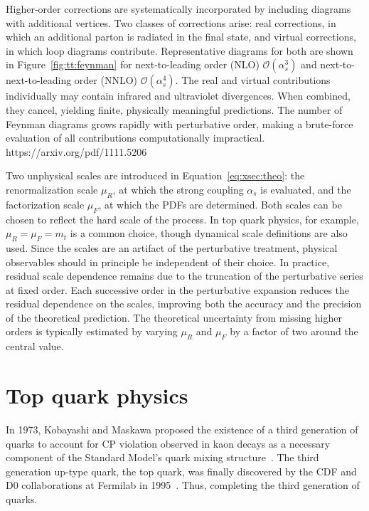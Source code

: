 Higher-order corrections are systematically incorporated by including diagrams with additional 
vertices. Two classes of corrections arise: real corrections, 
in which an additional parton is radiated in the final state, and virtual corrections, 
in which loop diagrams contribute.
Representative diagrams for both are shown in Figure~\ref{fig:tt:feynman} for next-to-leading order (NLO) $\mathcal{O}(\alpha_s^3)$
and next-to-next-to-leading order (NNLO) $\mathcal{O}(\alpha_s^4)$.
The real and virtual contributions individually may contain infrared and ultraviolet divergences.
When combined, they cancel, yielding finite, physically meaningful predictions. 
The number of Feynman diagrams grows rapidly with perturbative order, making a brute-force evaluation of all contributions computationally impractical. https://arxiv.org/pdf/1111.5206

Two unphysical scales are introduced in Equation~\eqref{eq:xsec:theo}: the renormalization scale $\mu_R$, at which the strong coupling $\alpha_s$ is evaluated, and the factorization scale $\mu_F$, at which the PDFs are determined. Both scales can be chosen to reflect the hard scale of the process.
In top quark physics, for example, $\mu_R = \mu_F = m_t$ is a common choice, though dynamical scale definitions are also used.
Since the scales are an artifact of the perturbative treatment, physical observables should in principle be independent of their choice.
In practice, residual scale dependence remains due to the truncation of the perturbative series at fixed order.
Each successive order in the perturbative expansion reduces the residual dependence on the scales, improving both the accuracy and the 
precision of the theoretical prediction.
The theoretical uncertainty from missing higher orders is typically estimated by
varying $\mu_R$ and $\mu_F$ by a factor of two around the central value.

\section{Top quark physics}

In 1973, Kobayashi and Maskawa proposed the existence of a third generation of quarks to account for CP violation observed in kaon decays as a necessary component of the Standard Model's quark mixing structure~\cite{Kobayashi:1973fv}. 
The third generation up-type quark, the top quark,
was finally discovered by the CDF and D0 collaborations at Fermilab in 1995~\cite{TOP-CDF,TOP-D0}.
Thus, completing the third generation of quarks.

